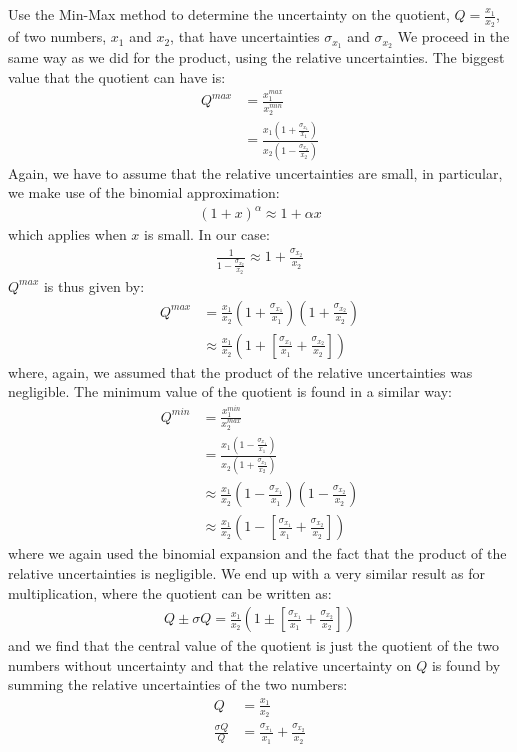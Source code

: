 \begin{example}{Use the Min-Max method to determine the uncertainty on the quotient, $Q=\frac{x_1}{x_2}$, of two numbers, $x_1$ and $x_2$, that have uncertainties $\sigma_{x_1}$ and $\sigma_{x_2}$}
We proceed in the same way as we did for the product, using the relative uncertainties. The biggest value that the quotient can have is:
\begin{align*}
Q^{max}&=\frac{x_1^{max}}{x_2^{min}}\nonumber\\
  &=\frac{x_1\left(1+\frac{\sigma_{x_1}}{x_1}\right)}{x_2\left(1-\frac{\sigma_{x_2}}{x_2}\right)}
\end{align*}
Again, we have to assume that the relative uncertainties are small, in particular, we make use of the binomial approximation:
\begin{align*}
(1+x)^\alpha\approx 1+\alpha x
\end{align*}
which applies when $x$ is small. In our case:
\begin{align*}
\frac{1}{1-\frac{\sigma_{x_2}}{x_2}}\approx 1+\frac{\sigma_{x_2}}{x_2}
\end{align*}
$Q^{max}$ is thus given by:
\begin{align*}
Q^{max}&=\frac{x_1}{x_2}\left(1+\frac{\sigma_{x_1}}{x_1}\right)\left(1+\frac{\sigma_{x_2}}{x_2}\right)\\
  &\approx \frac{x_1}{x_2}\left(1+\left[\frac{\sigma_{x_1}}{x_1}+\frac{\sigma_{x_2}}{x_2}\right]\right)
\end{align*}
where, again, we assumed that the product of the relative uncertainties was negligible. The minimum value of the quotient is found in a similar way:
\begin{align*}
Q^{min}&=\frac{x_1^{min}}{x_2^{max}}\nonumber\\
  &=\frac{x_1\left(1-\frac{\sigma_{x_1}}{x_1}\right)}{x_2\left(1+\frac{\sigma_{x_2}}{x_2}\right)}\\
  &\approx\frac{x_1}{x_2}\left(1-\frac{\sigma_{x_1}}{x_1}\right)\left(1-\frac{\sigma_{x_2}}{x_2}\right)\\
  &\approx \frac{x_1}{x_2}\left(1-\left[\frac{\sigma_{x_1}}{x_1}+\frac{\sigma_{x_2}}{x_2}\right]\right)
\end{align*}
where we again used the binomial expansion and the fact that the product of the relative uncertainties is negligible. We end up with a very similar result as for multiplication, where the quotient can be written as:
\begin{align*}
Q \pm \sigma Q = \frac{x_1}{x_2}\left(1\pm\left[\frac{\sigma_{x_1}}{x_1}+\frac{\sigma_{x_2}}{x_2}\right]\right)
\end{align*}
and we find that the central value of the quotient is just the quotient of the two numbers without uncertainty and that the relative uncertainty on $Q$ is found by summing the relative uncertainties of the two numbers:
\begin{align*}
Q&=\frac{x_1}{x_2}\\
\frac{\sigma Q}{Q} &= \frac{\sigma_{x_1}}{x_1}+\frac{\sigma_{x_2}}{x_2}
\end{align*}
\end{example}
